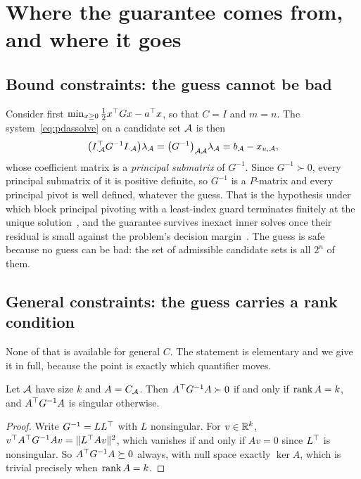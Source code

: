 \section{Where the guarantee comes from, and where it goes}
\label{sec:obstruction}

\subsection{Bound constraints: the guess cannot be bad}

Consider first $\min_{x \ge 0} \tfrac12 x^{\top} G x - a^{\top} x$, so that $C = I$ and
$m = n$. The system~\eqref{eq:pdassolve} on a candidate set $\mathcal{A}$ is then
\begin{equation}
  \bigl(I_{\cdot\mathcal{A}}^{\top} G^{-1} I_{\cdot\mathcal{A}}\bigr)\lambda_{\mathcal{A}}
  = \bigl(G^{-1}\bigr)_{\mathcal{A}\mathcal{A}}\lambda_{\mathcal{A}}
  = b_{\mathcal{A}} - x_{u,\mathcal{A}},
  \label{eq:principal}
\end{equation}
whose coefficient matrix is a \emph{principal submatrix} of $G^{-1}$. Since
$G^{-1} \succ 0$, every principal submatrix of it is positive definite, so
$G^{-1}$ is a $P$-matrix and every principal pivot is well defined, whatever the
guess. That is the hypothesis under which block principal pivoting with a
least-index guard terminates finitely at the unique
solution~\cite{judice1994,murty1988,cottle1992}, and the guarantee survives inexact
inner solves once their residual is small against the problem's decision
margin~\cite{schmelzer2026nncg}. The guess is safe because no guess can be bad:
the set of admissible candidate sets is all $2^n$ of them.

\subsection{General constraints: the guess carries a rank condition}

None of that is available for general $C$. The statement is elementary and we give
it in full, because the point is exactly which quantifier moves.

\begin{proposition}\label{prop:guessrank}
Let $\mathcal{A}$ have size $k$ and $A = C_{\mathcal{A}}$. Then $A^{\top} G^{-1} A \succ 0$ if
and only if $\operatorname{rank} A = k$, and $A^{\top} G^{-1}A$ is singular otherwise.
\end{proposition}

\begin{proof}
Write $G^{-1} = L L^{\top}$ with $L$ nonsingular. For $v \in \mathbb{R}^k$,
$v^{\top} A^{\top} G^{-1} A v = \lVert L^{\top} A v \rVert^2$, which vanishes if and only if $Av = 0$
since $L^{\top}$ is nonsingular. So $A^{\top} G^{-1}A \succeq 0$ always, with null space
exactly $\ker A$, which is trivial precisely when $\operatorname{rank} A = k$.
\end{proof}

